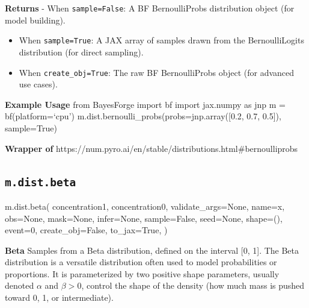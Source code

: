 \documentclass[
  letterpaper,
  DIV=11,
  numbers=noendperiod]{scrartcl}
\newenvironment{Shaded}{\begin{snugshade}}{\end{snugshade}}
\newcommand{\DecValTok}[1]{\textcolor[rgb]{0.68,0.00,0.00}{#1}}
\newcommand{\NormalTok}[1]{\textcolor[rgb]{0.00,0.23,0.31}{#1}}
\newcommand{\OperatorTok}[1]{\textcolor[rgb]{0.37,0.37,0.37}{#1}}
\newcommand{\StringTok}[1]{\textcolor[rgb]{0.13,0.47,0.30}{#1}}
\newcommand{\VariableTok}[1]{\textcolor[rgb]{0.07,0.07,0.07}{#1}}
\begin{document}
\textbf{Returns} - When \texttt{sample=False}: A BF BernoulliProbs
distribution object (for model building).

\begin{itemize}
\item
  When \texttt{sample=True}: A JAX array of samples drawn from the
  BernoulliLogits distribution (for direct sampling).
\item
  When \texttt{create\_obj=True}: The raw BF BernoulliProbs object (for
  advanced use cases).
\end{itemize}

\textbf{Example Usage} from BayesForge import bf import jax.numpy as jnp
m = bf(platform=`cpu') m.dist.bernoulli\_probs(probs=jnp.array({[}0.2,
0.7, 0.5{]}), sample=True)

\textbf{Wrapper of}
https://num.pyro.ai/en/stable/distributions.html\#bernoulliprobs

\subsection{\texorpdfstring{\texttt{m.dist.beta}}{m.dist.beta}}\label{beta}

\begin{Shaded}
\begin{Highlighting}[]
\NormalTok{m.dist.beta(}
\NormalTok{    concentration1,}
\NormalTok{    concentration0,}
\NormalTok{    validate\_args}\OperatorTok{=}\VariableTok{None}\NormalTok{,}
\NormalTok{    name}\OperatorTok{=}\StringTok{\textquotesingle{}x\textquotesingle{}}\NormalTok{,}
\NormalTok{    obs}\OperatorTok{=}\VariableTok{None}\NormalTok{,}
\NormalTok{    mask}\OperatorTok{=}\VariableTok{None}\NormalTok{,}
\NormalTok{    infer}\OperatorTok{=}\VariableTok{None}\NormalTok{,}
\NormalTok{    sample}\OperatorTok{=}\VariableTok{False}\NormalTok{,}
\NormalTok{    seed}\OperatorTok{=}\VariableTok{None}\NormalTok{,}
\NormalTok{    shape}\OperatorTok{=}\NormalTok{(),}
\NormalTok{    event}\OperatorTok{=}\DecValTok{0}\NormalTok{,}
\NormalTok{    create\_obj}\OperatorTok{=}\VariableTok{False}\NormalTok{,}
\NormalTok{    to\_jax}\OperatorTok{=}\VariableTok{True}\NormalTok{,}
\NormalTok{)}
\end{Highlighting}
\end{Shaded}

\textbf{Beta} Samples from a Beta distribution, defined on the interval
{[}0, 1{]}. The Beta distribution is a versatile distribution often used
to model probabilities or proportions. It is parameterized by two
positive shape parameters, usually denoted \(\alpha\) and \(\beta>0\),
control the shape of the density (how much mass is pushed toward 0, 1,
or intermediate).
\end{document}
